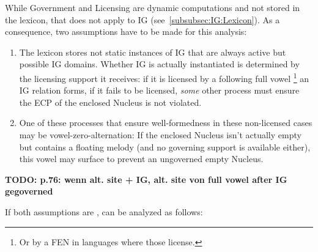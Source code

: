 While Government and Licensing are dynamic computations and not stored in the lexicon,
that does not apply to \gls{IG}
(see~\cref{subsubsec:IG:Lexicon}).
As a consequence, two assumptions have to be made for this
analysis:
\begin{enumerate}
\item The lexicon stores not static instances of \gls{IG} that are
  always active but possible \gls{IG} domains. Whether \gls{IG}
  is actually instantiated is determined by the licensing  support
  it receives: if it is licensed by a following full vowel%
  \footnote{Or by a \gls{FEN} in languages where those license.}
  an \gls{IG} relation forms, if it fails to be licensed, \emph{some}
  other process must ensure the \gls{ECP} of the enclosed Nucleus
  is not violated.
\item One of these processes that ensure well-formedness in these
  non-licensed cases may be vowel-zero-alternation:
  If the enclosed Nucleus isn't actually empty but contains a
  floating melody (and no governing support is available either),
  this vowel may surface to prevent an ungoverned empty Nucleus\footnotemark.
\end{enumerate}

\begin{deleted}
\begin{structure}{ \ti{[handlUN]}}
  \emptyV[gov]
  \emptyV
  \Ng[nolic]
  \fen
\end{structure}

\bigskip\textbf{TODO: p.76: wenn alt. site + IG, alt. site von full vowel after IG gegoverned}
\end{deleted}
If both assumptions are , 
can be analyzed as follows:
\begin{structure}{ \ti{[handlUN]}}
  \emptyV
  \emptyV
  \Ng[nolic]
  \fen
\end{structure}


\bigskip
{}

